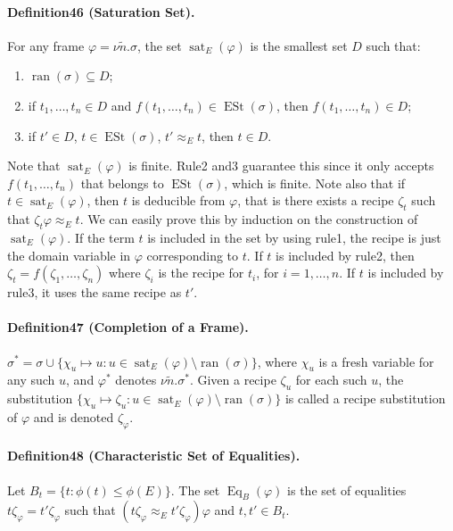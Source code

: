 \documentclass[10pt,a4paper]{amsart}
\begin{document}
\paragraph{Definition46 (Saturation Set).} For any frame $\varphi=\nu\tilde n.\sigma$, the set $\operatorname{sat}_E(\varphi)$ is the smallest set $D$ such that:
\begin{enumerate}
\item $\operatorname{ran}(\sigma)\subseteq D$;
\item if $t_1,\ldots,t_n\in D$ and $f(t_1,\ldots,t_n)\in\operatorname{ESt}(\sigma)$, then $f(t_1,\ldots,t_n)\in D$;
\item if $t'\in D$, $t\in\operatorname{ESt}(\sigma)$, $t'\approx_Et$, then $t\in D$.
\end{enumerate}
Note that $\operatorname{sat}_E(\varphi)$ is finite. Rule2 and3 guarantee this since it only accepts $f(t_1,\ldots,t_n)$ that belongs to $\operatorname{ESt}(\sigma)$, which is finite.
Note also that if $t\in\operatorname{sat}_E(\varphi)$, then $t$ is deducible from $\varphi$, that is there exists a recipe $\zeta_t$ such that $\zeta_t\varphi\approx_Et$. We can easily prove this by induction on the construction of $\operatorname{sat}_E(\varphi)$.
If the term $t$ is included in the set by using rule1, the recipe is just the domain variable in $\varphi$ corresponding to $t$.
If $t$ is included by rule2, then $\zeta_t=f(\zeta_1,\ldots,\zeta_n)$ where $\zeta_i$ is the recipe for $t_i$, for $i=1,\ldots,n$.
If $t$ is included by rule3, it uses the same recipe as $t'$.
\paragraph{Definition47 (Completion of a Frame).} $\sigma^*=\sigma\cup\{\chi_u\mapsto u:u\in\operatorname{sat}_E(\varphi)\setminus\operatorname{ran}(\sigma)\}$, where $\chi_u$ is a fresh variable for any such $u$, and $\varphi^*$ denotes $\nu\tilde n.\sigma^*$.
Given a recipe $\zeta_u$ for each such $u$, the substitution $\{\chi_u\mapsto\zeta_u:u\in\operatorname{sat}_E(\varphi)\setminus\operatorname{ran}(\sigma)\}$ is called a recipe substitution of $\varphi$ and is denoted $\zeta_\varphi$.
\paragraph{Definition48 (Characteristic Set of Equalities).} Let $B_t=\{t:\phi(t)\le\phi(E)\}$. The set $\operatorname{Eq}_B(\varphi)$ is the set of equalities $t\zeta_\varphi=t'\zeta_\varphi$ such that $(t\zeta_\varphi\approx_Et'\zeta_\varphi)\varphi$ and $t,t'\in B_t$.
\end{document}
